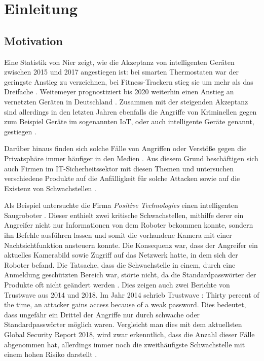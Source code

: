 \chapter{Einleitung}


\section{Motivation}
Eine Statistik von Nier zeigt, wie die Akzeptanz von intelligenten Geräten zwischen 2015 und 2017 angestiegen ist: bei smarten Thermostaten war der geringste Anstieg zu verzeichnen, bei Fitness-Trackern stieg sie um mehr als das Dreifache \cite{nier_2017}. Weitemeyer prognostiziert bis 2020 weiterhin einen Anstieg an vernetzten Geräten in Deutschland \cite{weitemeyer_2018}.
Zusammen mit der steigenden Akzeptanz sind allerdings in den letzten Jahren ebenfalls die Angriffe von Kriminellen gegen zum Beispiel Geräte im sogenannten \ac{IoT}, oder auch \glqq intelligente Geräte\grqq{} genannt, gestiegen \cite{statista_2019}.

Darüber hinaus finden sich solche Fälle von Angriffen oder Verstöße gegen die Privatsphäre immer häufiger in den Medien \cite{holland_2016,it_verlag_informationstechnik_gmbh_2018}. Aus diesem Grund beschäftigen sich auch Firmen im IT-Sicherheitssektor mit diesen Themen und untersuchen verschiedene Produkte auf die Anfälligkeit für solche Attacken sowie auf die Existenz von Schwachstellen \cite{lorenz_2018,ao_kaspersky_lab_2018}.

Als Beispiel untersuchte die Firma \emph{Positive Technologies} einen intelligenten Saugroboter \cite{salmi_2017}.
Dieser enthielt zwei kritische Schwachstellen, mithilfe derer ein Angreifer nicht nur Informationen von dem Roboter bekommen konnte, sondern ihn Befehle ausführen lassen und somit die vorhandene Kamera mit einer Nachtsichtfunktion ansteuern konnte. Die Konsequenz war, dass der Angreifer ein aktuelles Kamerabild sowie Zugriff auf das Netzwerk hatte, in dem sich der Roboter befand. Die Tatsache, dass die Schwachstelle in einem, durch eine Anmeldung geschützten Bereich war, störte nicht, da die Standardpasswörter der Produkte oft nicht geändert werden \cite{positive_technologies_2018}.
Dies zeigen auch zwei Berichte von Trustwave aus 2014 und 2018.
Im Jahr 2014 schrieb Trustwave \cite{trustwave_holdings_inc_2014}: \glqq Thirty percent of the time, an attacker gains access because of a weak password.\grqq{}
Dies bedeutet, dass ungefähr ein Drittel der Angriffe nur durch schwache oder Standardpasswörter möglich waren. Vergleicht man dies mit dem aktuellsten Global Security Report 2018, wird zwar erkenntlich, dass die Anzahl dieser Fälle abgenommen hat, allerdings immer noch die zweithäufigste Schwachstelle mit einem hohen Risiko darstellt \cite{trustwave_holdings_inc_2018}.

